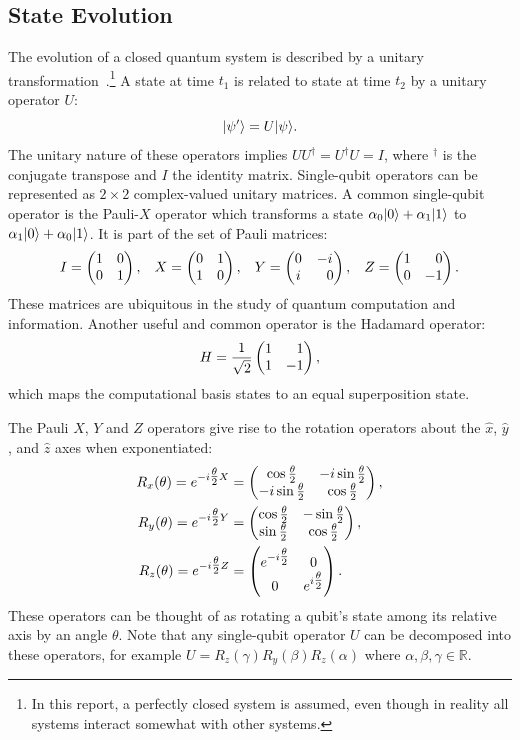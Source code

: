 \subsection{State Evolution} \label{sec:state-evolution}
The evolution of a closed quantum system is described by a unitary transformation~\cite{nielsen2002quantum}.\footnote{In this report, a perfectly closed system is assumed, even though in reality all systems interact somewhat with other systems.}
A state \ket{\psi} at time $t_1$ is related to state  at time $t_2$ by a unitary operator $U$:
\begin{equation}
\vert{\psi'}\rangle = U\vert{\psi}\rangle.
\end{equation}
The unitary nature of these operators implies $UU^\dagger = U^\dagger U = I$, where $^\dagger$ is the conjugate transpose and $I$ the identity matrix.
Single-qubit operators can be represented as $2 \times 2$ complex-valued unitary matrices.
A common single-qubit operator is the Pauli-$X$ operator which transforms a state $\alpha_0\vert{0}\rangle + \alpha_1\vert{1}\rangle$ to $\alpha_1\vert{0}\rangle + \alpha_0\vert{1}\rangle$.
It is part of the set of Pauli matrices:
\begin{equation}
I = \igate{}, \hspace*{3mm}
X = \xgate{}, \hspace*{3mm}
Y = \ygate{}, \hspace*{3mm}
Z = \zgate{}.
\end{equation}
These matrices are ubiquitous in the study of quantum computation and information.
Another useful and common operator is the Hadamard operator:
\begin{equation}
H = \hgate{},
\end{equation}
which maps the computational basis states to an equal superposition state.

The Pauli $X$, $Y$ and $Z$ operators give rise to the rotation operators about the $\hat{x}$, $\hat{y}$, and $\hat{z}$ axes when exponentiated:
\begin{align}
R_x(\theta) = e^{-i\tfrac{\theta}{2} X} &= \begin{pmatrix} \cos\tfrac{\theta}{2} & -i\sin\tfrac{\theta}{2} \\ -i\sin\tfrac{\theta}{2} & \cos\tfrac{\theta}{2} \end{pmatrix}{}, \\
R_y(\theta) = e^{-i\tfrac{\theta}{2} Y} &= \begin{pmatrix} \cos\tfrac{\theta}{2} & -\sin\tfrac{\theta}{2} \\ \sin\tfrac{\theta}{2} & \cos\tfrac{\theta}{2} \end{pmatrix}{}, \\
R_z(\theta) = e^{-i\tfrac{\theta}{2} Z} &= \begin{pmatrix} e^{-i\tfrac{\theta}{2}} & 0 \\ 0 & e^{i\tfrac{\theta}{2}} \end{pmatrix}{}.
\end{align}
These operators can be thought of as rotating a qubit's state among its relative axis by an angle $\theta$.
Note that any single-qubit operator $U$ can be decomposed into these operators, for example $U = R_z(\gamma)R_y(\beta)R_z(\alpha)$ where $\alpha, \beta, \gamma \in \mathbb{R}$.

